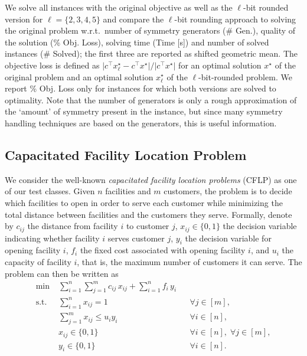 \documentclass[runningheads]{llncs}
\newcommand{\abs}[1]{\lvert{#1}\rvert}
\newcommand{\T}{^\top}
\begin{document}
We solve all instances with the original objective as well as the $\ell$-bit rounded version for $\ell=\{2, 3, 4, 5\}$ and compare the $\ell$-bit rounding approach to solving the original problem w.r.t.\ number of symmetry generators (\# Gen.), quality of the solution (\% Obj. Loss), solving time (Time [s]) and number of solved instances (\# Solved); the first three are reported as shifted geometric mean.
The objective loss is defined as $\abs{c\T x_{\ell}^{\star} - c\T x^{\star}} / \abs{c\T x^\star}$ for an optimal solution $x^\star$ of the original problem and an optimal solution $x^\star_\ell$ of the $\ell$-bit-rounded problem. We report \% Obj. Loss only for instances for which both versions are solved to optimality. 
Note that the number of generators is only a rough approximation of the `amount' of symmetry present in the instance, but since many symmetry handling techniques are based on the generators, this is useful information.

\subsection{Capacitated Facility Location Problem}

We consider the well-known \emph{capacitated facility location problems} (CFLP) as one of our test classes. Given $n$ facilities and $m$ customers, the problem is to decide which facilities to open in order to serve each customer while minimizing the total distance between facilities and the customers they serve. Formally, denote by $c_{ij}$ the distance from facility $i$ to customer $j$, $x_{ij} \in \{0,1\}$ the decision variable indicating whether facility $i$ serves customer $j$, $y_i$ the decision variable for opening facility $i$, $f_i$ the fixed cost associated with opening facility $i$, and $u_i$ the capacity of facility $i$, that is, the maximum number of customers it can serve. The problem can then be written as
\begin{align*}
    \min\; &\sum_{i=1}^n\sum_{j=1}^m c_{ij}\, x_{ij} + \sum_{i=1}^n f_i\, y_i \\
    \text{s.t.}\; &\sum_{i=1}^n x_{ij} = 1 && \forall j\in [m], \\
    &\sum_{j=1}^m x_{ij} \le u_i y_i && \forall i \in [n], \\
    &x_{ij} \in \{0, 1\} && \forall i\in [n],\; \forall j\in [m], \\
    &y_i \in \{0,1\} && \forall i\in [n].
\end{align*}
\end{document}
